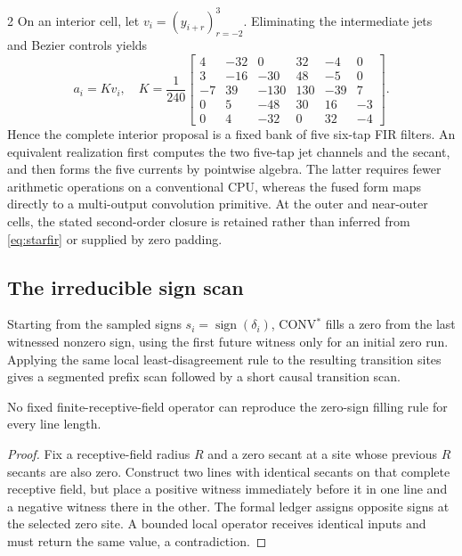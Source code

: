 \begin{multicols}{2}
On an interior cell, let \(v_i=(y_{i+r})_{r=-2}^{3}\). Eliminating the
intermediate jets and Bezier controls yields
\begin{equation}
 a_i=Kv_i,\quad K=\frac1{240}
 \left[\begin{smallmatrix}
 4&-32&0&32&-4&0\\
 3&-16&-30&48&-5&0\\
 -7&39&-130&130&-39&7\\
 0&5&-48&30&16&-3\\
 0&4&-32&0&32&-4
 \end{smallmatrix}\right].
 \label{eq:starfir}
\end{equation}
Hence the complete interior proposal is a fixed bank of five six-tap FIR
filters. An equivalent realization first computes the two five-tap jet
channels and the secant, and then forms the five currents by pointwise
algebra. The latter requires fewer arithmetic operations on a conventional
CPU, whereas the fused form maps directly to a multi-output convolution
primitive. At the outer and near-outer cells, the stated second-order closure
is retained rather than inferred from \eqref{eq:starfir} or supplied by zero
padding.

\subsection{The irreducible sign scan}

Starting from the sampled signs
\(s_i=\operatorname{sign}(\delta_i)\), CONV$^{*}$ fills a zero from the last
witnessed nonzero sign, using the first future witness only for an initial
zero run. Applying the same local least-disagreement rule to the resulting
transition sites gives a segmented prefix scan followed by a short causal
transition scan.

\begin{proposition}
No fixed finite-receptive-field operator can reproduce the zero-sign filling
rule for every line length.
\end{proposition}

\begin{proof}
Fix a receptive-field radius \(R\) and a zero secant at a site whose previous
\(R\) secants are also zero. Construct two lines with identical secants on
that complete receptive field, but place a positive witness immediately
before it in one line and a negative witness there in the other. The formal
ledger assigns opposite signs at the selected zero site. A bounded local
operator receives identical inputs and must return the same value, a
contradiction.
\end{proof}


\end{multicols}
